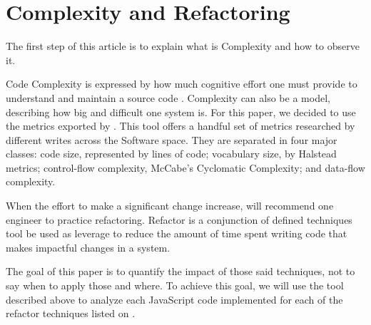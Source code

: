 \section{Complexity and Refactoring}

The first step of this article is to explain what is Complexity and how to observe it.



Code Complexity is expressed by how much cognitive effort one must provide to understand and maintain a source code
\cite{article:fmricc}. Complexity can also be a model, describing how big and difficult one system is. For this paper,
we decided to use the metrics exported by \cite{article:mozilla}. This tool offers a handful set of metrics researched by
different writes across the Software space. They are separated in four major classes: code size, represented by lines of code;
vocabulary size, by Halstead metrics; control-flow complexity, McCabe's Cyclomatic Complexity; and data-flow complexity.


When the effort to make a significant change increase, \cite{book:refactoring} will recommend one engineer to practice
refactoring. Refactor is a conjunction of defined techniques tool be used as leverage to reduce the amount of time spent
writing code that makes impactful changes in a system.


The goal of this paper is to quantify the impact of those said techniques, not to say when to apply those and where.
To achieve this goal, we will use the tool described above to analyze each JavaScript code implemented for each of the refactor
techniques listed on \cite{book:refactoring}.
